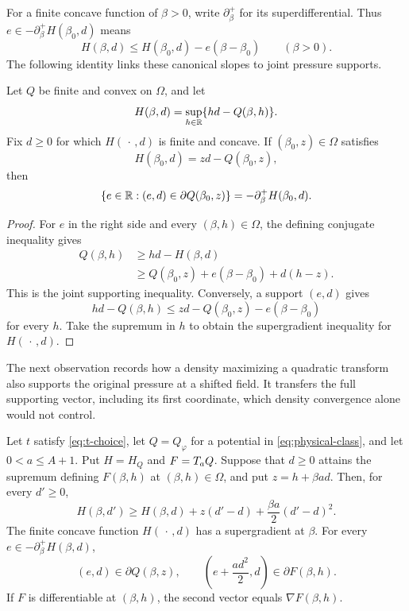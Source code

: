 For a finite concave function of \(\beta>0\), write
\(\partial_\beta^+\) for its superdifferential.
Thus \(e\in-\partial_\beta^+H(\beta_0,d)\) means
\[
 H(\beta,d)\le H(\beta_0,d)-e(\beta-\beta_0)
 \qquad(\beta>0).
\]
The following identity links these canonical slopes to joint
pressure supports.

\begin{lemma}\label{lem:joint-support}
Let \(Q\) be finite and convex on \(\Omega\), and let
\[
 H(\beta,d)=\sup_{h\in\mathbb R}\{hd-Q(\beta,h)\}.
\]
Fix \(d\ge0\) for which \(H(\,\cdot\,,d)\) is finite and concave.
If \((\beta_0,z)\in\Omega\) satisfies
\[
 H(\beta_0,d)=zd-Q(\beta_0,z),
\]
then
\begin{equation}\label{eq:joint-support-identity}
 \{e\in\mathbb R:(e,d)\in\partial Q(\beta_0,z)\}
       =-\partial_\beta^+H(\beta_0,d).
\end{equation}
\end{lemma}

\begin{proof}
For \(e\) in the right side and every \((\beta,h)\in\Omega\),
the defining conjugate inequality gives
\begin{align*}
 Q(\beta,h)
 &\ge hd-H(\beta,d)\\
 &\ge Q(\beta_0,z)+e(\beta-\beta_0)+d(h-z).
\end{align*}
This is the joint supporting inequality.
Conversely, a support \((e,d)\) gives
\[
 hd-Q(\beta,h)\le
 zd-Q(\beta_0,z)-e(\beta-\beta_0)
\]
for every \(h\).  Take the supremum in \(h\) to obtain the
supergradient inequality for \(H(\,\cdot\,,d)\).
\end{proof}

The next observation records how a density maximizing a quadratic transform
also supports the original pressure at a shifted field. It transfers the full
supporting vector, including its first coordinate, which density convergence
alone would not control.

\begin{lemma}\label{lem:transform-support}
Let $t$ satisfy \eqref{eq:t-choice}, let $Q=Q_\varphi$ for a potential
in \eqref{eq:physical-class}, and let $0<a\le A+1$. Put $H=H_Q$ and
$F=T_aQ$. Suppose that $d\ge0$ attains the supremum defining
$F(\beta,h)$ at $(\beta,h)\in\Omega$, and put $z=h+\beta ad$.
Then, for every $d'\ge0$,
\begin{equation}\label{eq:quadratic-density-support}
 H(\beta,d')\ge H(\beta,d)+z(d'-d)
                         +\frac{\beta a}{2}(d'-d)^2.
\end{equation}
The finite concave function $H(\,\cdot\,,d)$ has a supergradient at $\beta$.
For every $e\in-\partial_\beta^+H(\beta,d)$,
\begin{equation}\label{eq:transform-support-transfer}
 (e,d)\in\partial Q(\beta,z),\qquad
 \left(e+\frac{ad^2}{2},d\right)\in\partial F(\beta,h).
\end{equation}
If $F$ is differentiable at $(\beta,h)$, the second vector equals
$\nabla F(\beta,h)$.
\end{lemma}

